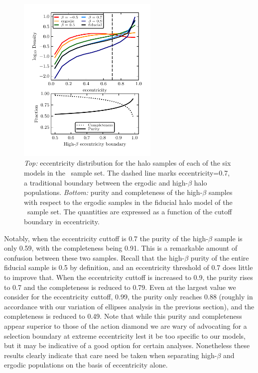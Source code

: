 \begin{figure}
    \centering
    \includegraphics[width=0.6\textwidth]{figure/ch2/APOGEEHaloEccentricityDistribution.pdf}
    \caption{\textit{Top:} eccentricity distribution for the halo samples of each of the six models in the \survey\ sample set. The dashed line marks eccentricity=0.7, a traditional boundary between the ergodic and high-$\beta$ halo populations. \textit{Bottom:} purity and completeness of the high-$\beta$ samples with respect to the ergodic samples in the fiducial halo model of the \survey\ sample set. The quantities are expressed as a function of the cutoff boundary in eccentricity.}
    \label{ch2:fig:EccentricityDistributions}
\end{figure}

Notably, when the eccentricity cuttoff is 0.7 the purity of the high-$\beta$ sample is only 0.59, with the completeness being 0.91. This is a remarkable amount of confusion between these two samples. Recall that the high-$\beta$ purity of the entire fiducial sample is 0.5 by definition, and an eccentricity threshold of 0.7 does little to improve that. When the eccentricity cuttoff is increased to 0.9, the purity rises to 0.7 and the completeness is reduced to 0.79. Even at the largest value we consider for the eccentricity cuttoff, 0.99, the purity only reaches 0.88 (roughly in accordance with our variation of ellipses analysis in the previous section), and the completeness is reduced to 0.49. Note that while this purity and completeness appear superior to those of the action diamond we are wary of advocating for a selection boundary at extreme eccentricity lest it be too specific to our models, but it may be indicative of a good option for certain analyses. Nonetheless these results clearly indicate that care need be taken when separating high-$\beta$ and ergodic populations on the basis of eccentricity alone.

